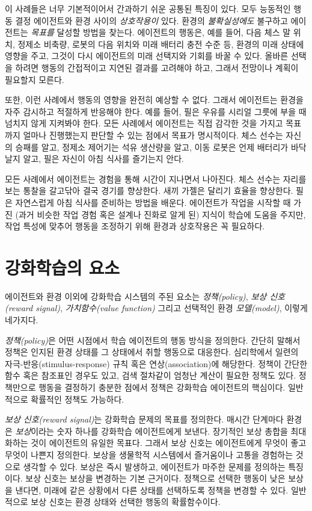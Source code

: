 이 사례들은 너무 기본적이어서 간과하기 쉬운 공통된 특징이 있다. 모두 능동적인
행동 결정 에이전트와 환경 사이의 \emph{상호작용이} 있다. 환경의
\emph{불확실성에도} 불구하고 에이전트는 \emph{목표를} 달성할 방법을 찾는다.
에이전트의 행동은, 예를 들어, 다음 체스 말 위치, 정제소 비축량, 로봇의 다음
위치와 미래 배터리 충전 수준 등, 환경의 미래 상태에 영향을 주고, 그것이 다시
에이전트의 미래 선택지와 기회를 바꿀 수 있다. 올바른 선택을 하려면 행동의
간접적이고 지연된 결과를 고려해야 하고, 그래서 전망이나 계획이 필요할지 모른다.

또한, 이런 사례에서 행동의 영향을 완전히 예상할 수 없다. 그래서 에이전트는
환경을 자주 감시하고 적절하게 반응해야 한다. 예를 들어, 필은 우유를 시리얼
그릇에 부을 때 넘치지 않게 지켜봐야 한다. 모든 사례에서 에이전트는 직접 감각한
것을 가지고 목표까지 얼마나 진행했는지 판단할 수 있는 점에서 목표가 명시적이다.
체스 선수는 자신의 승패를 알고, 정제소 제어기는 석유 생산량을 알고, 이동 로봇은
언제 배터리가 바닥날지 알고, 필은 자신이 아침 식사를 즐기는지 안다.

모든 사례에서 에이전트는 경험을 통해 시간이 지나면서 나아진다. 체스 선수는
자리를 보는 통찰을 갈고닦아 결국 경기를 향상한다. 새끼 가젤은 달리기 효율을
향상한다. 필은 자연스럽게 아침 식사를 준비하는 방법을 배운다. 에이전트가 작업을
시작할 때 가진 (과거 비슷한 작업 경험 혹은 설계나 진화로 알게 된) 지식이 학습에
도움을 주지만, 작업 특성에 맞추어 행동을 조정하기 위해 환경과 상호작용은 꼭
필요하다.


\section{강화학습의 요소}

에이전트와 환경 이외에 강화학습 시스템의 주된 요소는 \emph{정책(policy)},
\emph{보상 신호(reward signal)}, \emph{가치함수(value function)} 그리고 선택적인
환경 \emph{모델(model)}, 이렇게  네가지다.

\emph{정책(policy)}은 어떤 시점에서 학습 에이전트의 행동 방식을 정의한다. 간단히
말해서 정책은 인지된 환경 상태를 그 상태에서 취할 행동으로 대응한다. 심리학에서
일련의 자극-반응(stimulus-response) 규칙 혹은
연상(association)에 해당한다. 정책이 간단한 함수 혹은 참조표인 경우도 있고, 검색
절차같이 엄청난 계산이 필요한 정책도 있다. 정책만으로 행동을 결정하기 충분한
점에서 정책은 강화학습 에이전트의 핵심이다. 일반적으로 확률적인 정책도 가능하다.

\emph{보상 신호(reward signal)}는 강화학습 문제의 목표를 정의한다. 매시간
단계마다 환경은 \emph{보상}이라는 숫자 하나를 강화학습 에이전트에게 보낸다.
장기적인 보상 총합을 최대화하는 것이 에이전트의 유일한 목표다. 그래서 보상
신호는 에이전트에게 무엇이 좋고 무엇이 나쁜지 정의한다. 보상을 생물학적
시스템에서 즐거움이나 고통을 경험하는 것으로 생각할 수 있다. 보상은 즉시
발생하고, 에이전트가 마주한 문제를 정의하는 특징이다.
보상 신호는 보상을 변경하는 기본
근거이다. 정책으로 선택한 행동이 낮은 보상을 낸다면, 미래에 같은 상황에서 다른
상태를 선택하도록 정책을 변경할 수 있다. 일반적으로 보상 신호는 환경 상태와
선택한 행동의 확률함수이다.

